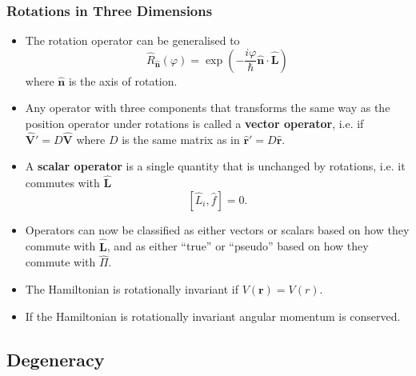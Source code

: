 \documentclass{article}
\renewcommand{\vec}[1]{\boldsymbol{\mathbf{#1}}}
\newcommand{\uvec}[1]{\hat{\vec{#1}}}
\begin{document}
\subsubsection{Rotations in Three Dimensions}

\begin{itemize}
  \item The rotation operator can be generalised to \[\hat{R}_{\uvec{n}} (\varphi) = \exp \left( -\frac{i \varphi}{\hbar} \uvec{n} \cdot \uvec{L} \right)\] where $\uvec{n}$ is the axis of rotation.

  \item Any operator with three components that transforms the same way as the position operator under rotations is called a \textbf{vector operator}, i.e. if $\uvec{V}' = D \uvec{V}$ where $D$ is the same matrix as in $\uvec{r}' = D \uvec{r}$.

  \item A \textbf{scalar operator} is a single quantity that is unchanged by rotations, i.e. it commutes with $\uvec{L}$ \[[\hat{L}_i, \hat{f}] = 0.\]

  \item Operators can now be classified as either vectors or scalars based on how they commute with $\uvec{L}$, and as either ``true'' or ``pseudo'' based on how they commute with $\hat{\Pi}$.

  \item The Hamiltonian is rotationally invariant if $V(\vec{r}) = V(r)$.

  \item If the Hamiltonian is rotationally invariant angular momentum is conserved.
\end{itemize}

\subsection{Degeneracy}
\end{document}
